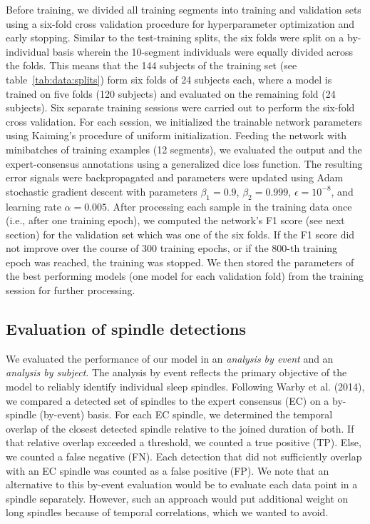 \documentclass[fleqn,twocolumn,10pt]{wlscirep}
\begin{document}
Before training, we divided all training segments into training and validation
sets using a six-fold cross validation procedure for hyperparameter optimization
and early stopping.
Similar to the test-training splits, the six folds were split on a by-individual
basis wherein the 10-segment individuals were equally divided across the folds.
This means that the 144 subjects of the training set (see table~\ref{tab:data:splits})
form six folds of 24 subjects each, where a model is trained on five folds
(120 subjects) and evaluated on the remaining fold (24 subjects).
Six separate training sessions were carried out to perform the six-fold cross validation.
For each session, we
initialized the trainable network parameters using Kaiming's procedure of
uniform initialization\cite{KaimingHe2015}.
Feeding the network with minibatches of training examples (12 segments), we
evaluated the output and the expert-consensus annotations using a generalized
dice loss function\cite{Sudre2017}.  The resulting error signals were
backpropagated and parameters were updated using Adam stochastic gradient
descent with parameters $\beta_1=0.9$, $\beta_2=0.999$, $\epsilon=10^{-8}$, and
learning rate $\alpha=0.005$\cite{Kingma2015}.
After processing each sample in the training data once (i.e., after one training
epoch), we computed the network's F1 score (see next section) for the
validation set which was one of the six folds.  If the F1 score did not improve
over the course of 300 training epochs, or if the 800-th training epoch was reached, the training
was stopped.  We then stored the parameters of the best performing models
(one model for each validation fold)
from the training session for further processing.

\subsection{Evaluation of spindle detections}
\label{sec:detection_evaluation}

We evaluated the performance of our model in an \emph{analysis by event} and an
\emph{analysis by subject}. The analysis by event reflects the primary objective
of the model to reliably identify individual sleep spindles.
Following Warby et al. (2014)\cite{Warby2014}, we compared a detected set of
spindles to the expert consensus (EC) on a by-spindle (by-event) basis.  For each EC
spindle, we determined the temporal overlap of the closest detected spindle
relative to the joined duration of both.  If that relative overlap exceeded a
threshold, we counted a true positive (TP).  Else, we counted a false negative (FN).
Each detection that did not sufficiently overlap with an EC spindle was counted
as a false positive (FP).
We note that an alternative to this by-event evaluation would be to evaluate
each data point in a spindle separately. However, such an approach
would put additional weight on long spindles because of temporal
correlations, which we wanted to avoid.
\end{document}
